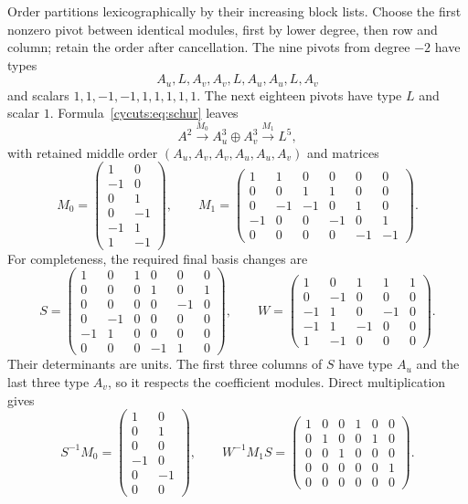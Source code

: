 Order partitions lexicographically by their increasing block lists.
Choose the first nonzero pivot between identical modules, first by
lower degree, then row and column; retain the order after cancellation.
The nine pivots from degree $-2$ have types
\[
 A_u,L,A_v,A_v,L,A_u,A_u,L,A_v
\]
and scalars $1,1,-1,-1,1,1,1,1,1$. The next eighteen pivots have
type $L$ and scalar $1$. Formula~\eqref{cycuts:eq:schur} leaves
\[
 A^2\xrightarrow{M_0}A_u^3\oplus A_v^3\xrightarrow{M_1}L^5,
\]
with retained middle order $(A_u,A_v,A_v,A_u,A_u,A_v)$ and matrices
\begin{equation}\label{cycuts:eq:crossed-matrices}
 M_0=\begin{pmatrix}1&0\\-1&0\\0&1\\0&-1\\-1&1\\1&-1\end{pmatrix},
 \qquad
 M_1=\begin{pmatrix}
 1&1&0&0&0&0\\0&0&1&1&0&0\\0&-1&-1&0&1&0\\
 -1&0&0&-1&0&1\\0&0&0&0&-1&-1
 \end{pmatrix}.
\end{equation}
For completeness, the required final basis changes are
\[
 S=\begin{pmatrix}
 1&0&1&0&0&0\\0&0&0&1&0&1\\0&0&0&0&-1&0\\
 0&-1&0&0&0&0\\-1&1&0&0&0&0\\0&0&0&-1&1&0
 \end{pmatrix},\qquad
 W=\begin{pmatrix}
 1&0&1&1&1\\0&-1&0&0&0\\-1&1&0&-1&0\\
 -1&1&-1&0&0\\1&-1&0&0&0
 \end{pmatrix}.
\]
Their determinants are units. The first three columns of $S$ have
type $A_u$ and the last three type $A_v$, so it respects the
coefficient modules. Direct multiplication gives
\begin{equation}\label{cycuts:eq:crossed-normal-form}
 S^{-1}M_0=
 \begin{pmatrix}1&0\\0&1\\0&0\\-1&0\\0&-1\\0&0\end{pmatrix},
 \qquad
 W^{-1}M_1S=
 \begin{pmatrix}
 1&0&0&1&0&0\\0&1&0&0&1&0\\0&0&1&0&0&0\\
 0&0&0&0&0&1\\0&0&0&0&0&0
 \end{pmatrix}.
\end{equation}

